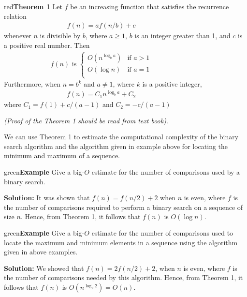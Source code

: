 \documentclass[11pt]{article}
\newenvironment{example}[1][\unskip]{\begin{mybox}{green}{\textbf{Example} {#1}}}{\end{mybox}}
\newenvironment{theorem}[1]{\begin{mybox}{red}{\textbf{Theorem #1}}}{\end{mybox}}
\begin{document}
\begin{theorem}
{1}
Let $f$ be an increasing function that satisfies the recurrence relation
\begin{align*}
    f(n) = af(n/b) + c & & & & & & & & &
\end{align*}
whenever $n$ is divisible by $b$, where $a \geq 1$, $b$ is an integer greater than 1, and $c$ is a positive real number. Then
\begin{align*}
    f(n) \text{ is } \begin{cases}
       O(n^{\log_b a}) & \text{if } a > 1\\
       O(\log n) & \text{if } a = 1\\
    \end{cases} & & & & & & & & &
\end{align*}
Furthermore, when $n = b^k$ and $a \neq 1$, where $k$ is a positive integer,
\begin{align*}
    f(n) = C_1 n^{\log_b a} + C_2 & & & & & & & & &
\end{align*}
where $C_1 = f(1) + c/(a - 1)$ and $C_2 = -c/(a - 1)$
\end{theorem}

\textit{(Proof of the Theorem 1 should be read from text book)}.

We can use Theorem 1 to estimate the computational complexity of the binary search algorithm and the algorithm given in example above for locating the minimum and maximum of a sequence.

\begin{example}
Give a big-$O$ estimate for the number of comparisons used by a binary search.

\textbf{Solution:}
It was shown that $f(n) = f(n/2) + 2$ when $n$ is even, where $f$ is the number of comparisons required to perform a binary search on a sequence of size $n$. Hence, from Theorem 1, it follows that $f(n)$ is $O(\log n)$.
\end{example}

\begin{example}
Give a big-$O$ estimate for the number of comparisons used to locate the maximum and minimum elements in a sequence using the algorithm given in above examples.

\textbf{Solution:}
We showed that $f(n) = 2f(n/2) + 2$, when $n$ is even, where $f$ is the number of comparisons needed by this algorithm. Hence, from Theorem 1, it follows that $f(n)$ is $O(n^{\log_2 2}) = O(n)$.
\end{example}
\end{document}
